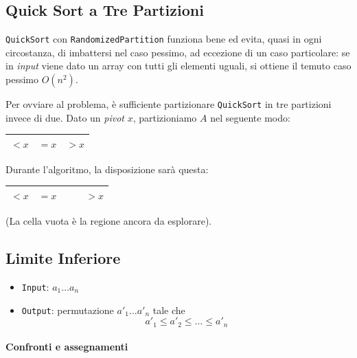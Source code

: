 \subsection{Quick Sort a Tre Partizioni}
\texttt{QuickSort} con \texttt{RandomizedPartition} funziona bene ed 
evita, quasi in ogni circostanza, di imbattersi nel caso pessimo, ad 
eccezione di un caso particolare: se in \emph{input} viene dato un 
array con tutti gli elementi uguali, si ottiene il temuto caso pessimo $O(n^2)$.\par
Per ovviare al problema, è sufficiente partizionare \texttt{QuickSort} in tre
partizioni invece di due. Dato un \emph{pivot} $x$, partizioniamo $A$ nel
seguente modo:

\begin{center}
    \begin{tabular}{|l|l|l|}
        \hline 
        $< x$ & $= x$ & $> x$ \\
        \hline
    \end{tabular}
\end{center}

Durante l'algoritmo, la disposizione sarà questa:

\begin{center}
    \begin{tabular}{|l|l|l|l|}
        \hline 
        $< x$ & $= x$ & $\quad$ & $> x$ \\
        \hline
    \end{tabular}
\end{center}
(La cella vuota è la regione ancora da esplorare).

 



\subsection{Limite Inferiore}

\begin{itemize}[label=]
    \item \texttt{Input}: $a_1 \dots a_n$
    \item \texttt{Output}: permutazione $a'_1 \dots a'_n$ tale che
    $$a'_1 \leq a'_2 \leq \dots \leq a'_n$$
\end{itemize}

\paragraph{Confronti e assegnamenti} 

